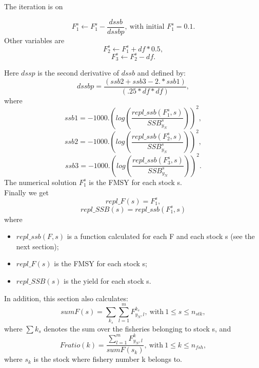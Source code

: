 \documentclass{article}
\begin{document}
The iteration is on

\begin{equation}
    F_{1}^s\leftarrow F_{1}^s-\dfrac{dssb}{dssbp}, \ \text{with initial $F_{1}^s=0.1$}.
\end{equation}
Other variables are
\begin{equation}
    F_2^s \leftarrow F_1^s+df*0.5,
\end{equation}
\begin{equation}
    F_3^s \leftarrow F_2^s -df.
\end{equation}

Here $dssp$ is the second derivative of $dssb$ and defined by:
\begin{equation}
    dssbp  = \dfrac{(ssb2 + ssb3 - 2.*ssb1)}{(.25*df*df)},
\end{equation}
where
\begin{equation}
    ssb1=-1000.\left(log\left(\dfrac{repl\_ssb(F_1^s,s)}{SSB^s_{y_N}}\right)\right)^2,
\end{equation}
\begin{equation}
    ssb2=-1000.\left(log\left(\dfrac{repl\_ssb(F_2^s,s)}{SSB^s_{y_N}}\right)\right)^2,
\end{equation}
\begin{equation}
    ssb3=-1000.\left(log\left(\dfrac{repl\_ssb(F_3^s,s)}{SSB^s_{y_N}}\right)\right)^2.
\end{equation}
The numerical solution $F_1^s$ is the  FMSY for each stock s.\\
Finally we get
\begin{equation}
    repl\_F(s) = F_1^s,
\end{equation}
\begin{equation}
    repl\_SSB(s) = repl\_ssb(F_1^s,s)
\end{equation}
where
\begin{itemize}
    \item $repl\_ssb(F,s)$ is a function calculated for each F and each stock s  (see the next section);
    \item $repl\_F(s)$ is the FMSY for each stock s;
    \item $repl\_SSB(s)$ is the yield for each stock s.
\end{itemize}

In addition, this section also calculates:
\begin{equation}
    sumF(s)=\sum_{k_s}\sum_{l=1}^m F^{k_s}_{y_N,l}, \  \text{with} \ 1\leq s \leq n_{stk},
\end{equation}
where $\sum k_s$ denotes the sum over the fisheries belonging to stock s, and
\begin{equation}
    Fratio(k)=\dfrac{\sum_{l=1}^mF^k_{y_N,l}}{sumF(s_k)}, \  \text{with} \ 1\leq k  \leq n_{fsh},
\end{equation}
where $s_k$ is the stock where fishery number k belongs to.
\end{document}
